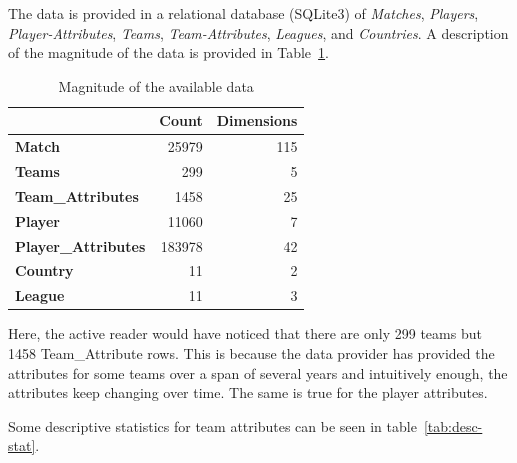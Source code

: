 \documentclass[11pt]{article}
\begin{document}
The data is provided in a relational database (SQLite3) of \textit{Matches}, \textit{Players}, \textit{Player-Attributes}, \textit{Teams}, \textit{Team-Attributes}, \textit{Leagues}, and \textit{Countries}.
A description of the magnitude of the data is provided in Table~\ref{tab:data-desc}.

\begin{table}[ht]
\centering
\begin{tabular}{|l|r|r|}
\hline
\textbf{}                   & \textbf{Count} & \textbf{Dimensions} \\ \hline
\textbf{Match}              & 25979          & 115                 \\ \hline
\textbf{Teams}              & 299            & 5                   \\ \hline
\textbf{Team\_Attributes}   & 1458           & 25                  \\ \hline
\textbf{Player}             & 11060          & 7                   \\ \hline
\textbf{Player\_Attributes} & 183978         & 42                  \\ \hline
\textbf{Country}            & 11             & 2                   \\ \hline
\textbf{League}             & 11             & 3                   \\ \hline
\end{tabular}
\caption{Magnitude of the available data}
\label{tab:data-desc}
\end{table}

Here, the active reader would have noticed that there are only 299 teams but 1458 Team\_Attribute rows.
This is because the data provider has provided the attributes for some teams over a span of several years and intuitively enough, the attributes keep changing over time.
The same is true for the player attributes.

Some descriptive statistics for team attributes can be seen in table~\ref{tab:desc-stat}.
\end{document}
